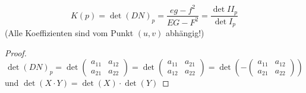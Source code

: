 \documentclass[../main.tex]{subfiles}
\begin{document}
\begin{corollary}
    $$K(p) = \det(DN)_{p} = \frac{eg-f^{2}}{EG-F^{2}}=\frac{\det II_p}{\det I_p}$$ (Alle Koeffizienten sind vom Punkt $(u,v)$ abhängig!)
\end{corollary}
\begin{proof}
    $$\det(DN)_{p} = \det\begin{pmatrix}
        a_{11} & a_{12} \\ a_{21} & a_{22}
    \end{pmatrix} = \det\begin{pmatrix}
        a_{11} & a_{21} \\ a_{12} & a_{22}
    \end{pmatrix} = \det\left( - \begin{pmatrix}
        a_{11} & a_{12} \\ a_{21} & a_{22}
    \end{pmatrix}\right)$$ und $\det(X\cdot Y) = \det(X)\cdot\det(Y)$
\end{proof}
\end{document}
